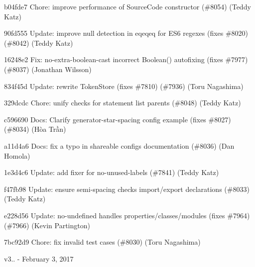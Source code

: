 \begin{DoxyItemize}
\item b04fde7 Chore\+: improve performance of Source\+Code constructor (\#8054) (Teddy Katz)
\item 90fd555 Update\+: improve null detection in eqeqeq for ES6 regexes (fixes \#8020) (\#8042) (Teddy Katz)
\item 16248e2 Fix\+: no-\/extra-\/boolean-\/cast incorrect Boolean() autofixing (fixes \#7977) (\#8037) (Jonathan Wilsson)
\item 834f45d Update\+: rewrite Token\+Store (fixes \#7810) (\#7936) (Toru Nagashima)
\item 329dcdc Chore\+: unify checks for statement list parents (\#8048) (Teddy Katz)
\item c596690 Docs\+: Clarify generator-\/star-\/spacing config example (fixes \#8027) (\#8034) (Hòa Trần)
\item a11d4a6 Docs\+: fix a typo in shareable configs documentation (\#8036) (Dan Homola)
\item 1e3d4c6 Update\+: add fixer for no-\/unused-\/labels (\#7841) (Teddy Katz)
\item f47fb98 Update\+: ensure semi-\/spacing checks import/export declarations (\#8033) (Teddy Katz)
\item e228d56 Update\+: no-\/undefined handles properties/classes/modules (fixes \#7964) (\#7966) (Kevin Partington)
\item 7bc92d9 Chore\+: fix invalid test cases (\#8030) (Toru Nagashima)
\end{DoxyItemize}

v3.. -\/ February 3, 2017



